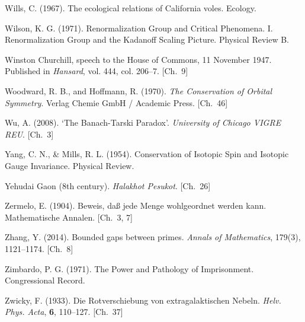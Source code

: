 \begin{list}{}{%
  \setlength{\leftmargin}{2em}%
  \setlength{\itemindent}{-2em}%
  \setlength{\itemsep}{0.35\baselineskip}%
  \setlength{\parsep}{0pt}%
  \setlength{\topsep}{0.5em}}
\item Wills, C. (1967). The ecological relations of California voles. Ecology.
\item Wilson, K. G. (1971). Renormalization Group and Critical Phenomena. I. Renormalization Group and the Kadanoff Scaling Picture. Physical Review B.
\item Winston Churchill, speech to the House of Commons, 11 November 1947. Published in \textit{Hansard}, vol. 444, col. 206–7. \hfill {\scriptsize [Ch.~9]}
\item Woodward, R. B., and Hoffmann, R. (1970). \textit{The Conservation of Orbital Symmetry}. Verlag Chemie GmbH / Academic Press. \hfill {\scriptsize [Ch.~46]}
\item Wu, A. (2008). `The Banach-Tarski Paradox'. \textit{University of Chicago VIGRE REU}. \hfill {\scriptsize [Ch.~3]}
\item Yang, C. N., \& Mills, R. L. (1954). Conservation of Isotopic Spin and Isotopic Gauge Invariance. Physical Review.
\item Yehudai Gaon (8th century). \textit{Halakhot Pesukot}. \hfill {\scriptsize [Ch.~26]}
\item Zermelo, E. (1904). Beweis, daß jede Menge wohlgeordnet werden kann. Mathematische Annalen. \hfill {\scriptsize [Ch.~3, 7]}
\item Zhang, Y. (2014). Bounded gaps between primes. \textit{Annals of Mathematics}, 179(3), 1121–1174. \hfill {\scriptsize [Ch.~8]}
\item Zimbardo, P. G. (1971). The Power and Pathology of Imprisonment. Congressional Record.
\item Zwicky, F. (1933). Die Rotverschiebung von extragalaktischen Nebeln. \textit{Helv. Phys. Acta}, \textbf{6}, 110–127. \hfill {\scriptsize [Ch.~37]}
\end{list}

